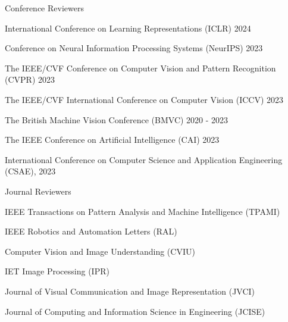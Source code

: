 


\begin{cventries}

\cvpub
{Conference Reviewers} %
{ %
\begin{cvitems}
    \item {International Conference on Learning Representations (ICLR) 2024}
    \item {Conference on Neural Information Processing Systems (NeurIPS) 2023}
    \item {The IEEE/CVF Conference on Computer Vision and Pattern Recognition (CVPR) 2023}
    \item {The IEEE/CVF International Conference on Computer Vision (ICCV) 2023}
    \item {The British Machine Vision Conference (BMVC) 2020 - 2023}
    \item {The IEEE Conference on Artificial Intelligence (CAI) 2023}
    \item {International Conference on Computer Science and Application Engineering (CSAE), 2023}
\end{cvitems}
}

\vspace{-.5em}
\cvpub
{Journal Reviewers} %
{
\begin{cvitems}
    \item {IEEE Transactions on Pattern Analysis and Machine Intelligence (TPAMI)}
    \item{ IEEE Robotics and Automation Letters (RAL)}
    \item {Computer Vision and Image Understanding (CVIU)}
    \item {IET Image Processing (IPR)}
    \item {Journal of Visual Communication and Image Representation (JVCI)}
    \item {Journal of Computing and Information Science in Engineering (JCISE)}
\end{cvitems}
}
\end{cventries}

